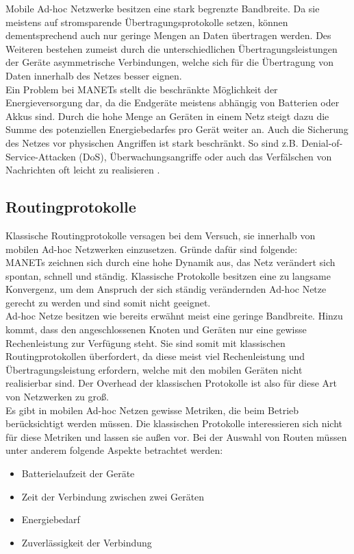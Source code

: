 Mobile Ad-hoc Netzwerke besitzen eine stark begrenzte Bandbreite. Da sie meistens auf stromsparende Übertragungsprotokolle setzen, können dementsprechend auch nur geringe Mengen an Daten übertragen werden. Des Weiteren bestehen zumeist durch die unterschiedlichen Übertragungsleistungen der Geräte asymmetrische Verbindungen, welche sich für die Übertragung von Daten innerhalb des Netzes besser eignen.\\

Ein Problem bei MANETs stellt die beschränkte Möglichkeit der Energieversorgung dar, da die Endgeräte meistens abhängig von Batterien oder Akkus sind. Durch die hohe Menge an Geräten in einem Netz steigt dazu die Summe des potenziellen Energiebedarfes pro Gerät weiter an. Auch die Sicherung des Netzes vor physischen Angriffen ist stark beschränkt. So sind z.B. Denial-of-Service-Attacken (DoS), Überwachungsangriffe oder auch das Verfälschen von Nachrichten oft leicht zu realisieren \cite{d:timm}.

\subsection{Routingprotokolle}\label{ss:Routingprotokolle}

Klassische Routingprotokolle versagen bei dem Versuch, sie innerhalb von mobilen Ad-hoc Netzwerken einzusetzen. Gründe dafür sind folgende: \\

MANETs zeichnen sich durch eine hohe Dynamik aus, das Netz verändert sich spontan, schnell und ständig. Klassische Protokolle besitzen eine zu langsame Konvergenz, um dem Anspruch der sich ständig verändernden Ad-hoc Netze gerecht zu werden und sind somit nicht geeignet.\\

Ad-hoc Netze besitzen wie bereits erwähnt meist eine geringe Bandbreite. Hinzu kommt, dass den angeschlossenen Knoten und Geräten nur eine gewisse Rechenleistung zur Verfügung steht. Sie sind somit mit klassischen Routingprotokollen überfordert, da diese meist viel Rechenleistung und Übertragungsleistung erfordern, welche mit den mobilen Geräten nicht realisierbar sind. Der Overhead der klassischen Protokolle ist also für diese Art von Netzwerken zu groß. \\

Es gibt in mobilen Ad-hoc Netzen gewisse Metriken, die beim Betrieb berück\-sichtigt werden müssen. Die klassischen Protokolle interessieren sich nicht für diese Metriken und lassen sie außen vor. Bei der Auswahl von Routen müssen unter anderem folgende Aspekte betrachtet werden:
\begin{itemize}
	\item Batterielaufzeit der Geräte
	\item Zeit der Verbindung zwischen zwei Geräten
	\item Energiebedarf
	\item Zuverlässigkeit der Verbindung
\end{itemize} 


